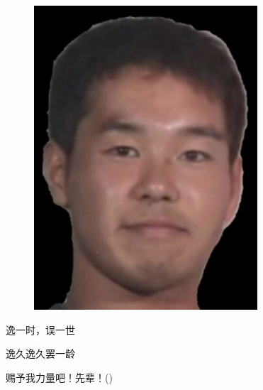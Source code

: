 \documentclass[titlepage, a4paper]{article}
\begin{document}
	\begin{titlepage}
		\begin{center}
			\Huge{}
			
			\Large{}
			
			\begin{figure}[H]
				\centering
				\includegraphics[scale=1.3]{senpai.png}
			\end{figure}
		
			\Huge{逸一时，误一世}
			
			\Huge{逸久逸久罢一龄}
			
			\Huge{赐予我力量吧！先辈！()}
		\end{center}
	\end{titlepage}
\end{document}
